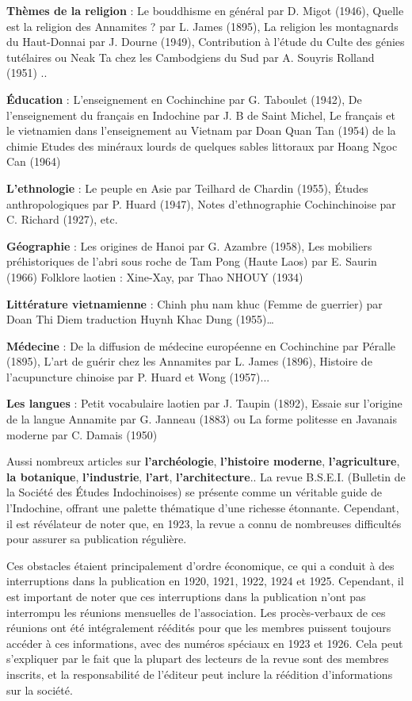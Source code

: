 \textbf{Thèmes de la religion} : Le bouddhisme en général par D. Migot (1946), Quelle est la religion des Annamites ? par L. James (1895), La religion les montagnards du Haut-Donnai par J. Dourne (1949), Contribution à l'étude du Culte des génies tutélaires ou Neak Ta chez les Cambodgiens du Sud par A. Souyris Rolland (1951) .. 

\textbf{Éducation} : L’enseignement en Cochinchine par G. Taboulet (1942), De l’enseignement du français en Indochine par J. B de Saint Michel, Le français et le vietnamien dans l’enseignement au Vietnam par Doan Quan Tan (1954) de la chimie Etudes des minéraux lourds de quelques sables littoraux par Hoang Ngoc Can (1964)

\textbf{L'ethnologie} : Le peuple en Asie par Teilhard de Chardin (1955), Études anthropologiques par P. Huard (1947), Notes d'ethnographie Cochinchinoise par C. Richard (1927), etc. 

\textbf{Géographie} : Les origines de Hanoi par G. Azambre (1958), Les mobiliers préhistoriques de l'abri sous roche de Tam Pong (Haute Laos) par E. Saurin (1966) 
Folklore laotien : Xine-Xay, par Thao NHOUY (1934) 

\textbf{Littérature vietnamienne} : Chinh phu nam khuc (Femme de guerrier) par Doan Thi Diem traduction Huynh Khac Dung (1955)… 

\textbf{Médecine} : De la diffusion de médecine européenne en Cochinchine par Péralle (1895), L'art de guérir chez les Annamites par L. James (1896), Histoire de l'acupuncture chinoise par P. Huard et Wong (1957)... 

\textbf{Les langues} : Petit vocabulaire laotien par J. Taupin (1892), Essaie sur l'origine de la langue  Annamite par G. Janneau (1883) ou La forme politesse en Javanais moderne par C. Damais (1950) 

Aussi nombreux articles sur \textbf{l’archéologie}, \textbf{l’histoire moderne}, \textbf{l'agriculture}, \textbf{la botanique}, \textbf{l'industrie}, \textbf{l'art}, \textbf{l'architecture}..
La revue B.S.E.I. (Bulletin de la Société des Études Indochinoises) se présente comme un véritable guide de l'Indochine, offrant une palette thématique d'une richesse étonnante. Cependant, il est révélateur de noter que, en 1923, la revue a connu de nombreuses difficultés pour assurer sa publication régulière.

Ces obstacles étaient principalement d'ordre économique, ce qui a conduit à des interruptions dans la publication en 1920, 1921, 1922, 1924 et 1925. Cependant, il est important de noter que ces interruptions dans la publication n'ont pas interrompu les réunions mensuelles de l'association. Les procès-verbaux de ces réunions ont été intégralement réédités pour que les membres puissent toujours accéder à ces informations, avec des numéros spéciaux en 1923 et 1926. Cela peut s'expliquer par le fait que la plupart des lecteurs de la revue sont des membres inscrits, et la responsabilité de l'éditeur peut inclure la réédition d'informations sur la société.

